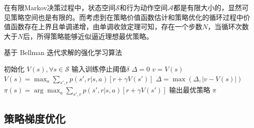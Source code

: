 在有限Markov决策过程中，状态空间$\mathcal{S}$和行为动作空间$\mathcal{A}$都是有限大小的，显然可见策略空间也是有限的。而考虑到在策略价值函数估计和策略优化的循环过程中价值函数存在上界且单调递增，由单调收敛定理可知，存在一个步数$N$，当循环次数大于$N$后，所得策略能够近似逼近理想最优策略。

\begin{algorithm}[ht]
    \caption{基于 Bellman 迭代求解的强化学习算法}
    \label{algo:bellman-update}
    \begin{algorithmic}
        \STATE 初始化 $V(s), \forall s\in \mathcal S$
        \STATE 输入训练停止阈值$\delta$
        \STATE
        \REPEAT
        \STATE $\Delta= 0$
        \STATE $v= V(s)$
        \STATE $V(s)= \max_a\sum_{s',r}p(s',r|s,a)[r+\gamma V(s')]$
        \STATE $\Delta = \max(\Delta,|v-V(s)|)$
        \ENDFOR
        \UNTIL{ $\Delta<\delta$}
        \STATE $\pi(s)=\arg\max_a\sum_{s',r}p(s',r|s,a)[r+\gamma V(s')]$
        \STATE
        \STATE 输出最优策略 $\pi$
    \end{algorithmic}
\end{algorithm}

\subsection{策略梯度优化}

